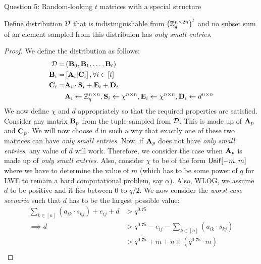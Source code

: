 \begin{solution}{Question 5: Random-looking $t$ matrices with a special structure}\label{ques:5}
    \begin{question}
        Define distribution $\mathcal{D}$ that is indistinguishable from $\left(\mathbb{Z}_q^{n\times 2n}\right)^t$ and no subset sum of an element sampled from this distribuion has \textit{only small entries}.
    \end{question}
    \tcblower{}
    \begin{proof}
        We define the distribution as follows:
        \begin{equation}
            \begin{split}
                \mathcal{D} = &\left(\mathbf{B}_0, \mathbf{B}_1, \ldots, \mathbf{B}_t\right)\\
                \mathbf{B}_i = &\left[\mathbf{A}_i | \mathbf{C}_i\right], \forall i\in [t]\\
                \mathbf{C}_i = &\mathbf{A}_i\cdot\mathbf{S}_i + \mathbf{E}_i + \mathbf{D}_i\\
                &\mathbf{A}_i\gets\mathbb{Z}_q^{n\times n}, \mathbf{S}_i\gets\chi^{n\times n}, \mathbf{E}_i\gets\chi^{n\times n}, \mathbf{D}_i\gets d^{n\times n}
            \end{split}
        \end{equation}
        We now define $\chi$ and $d$ appropriately so that the required properties are satisfied. Consider any matrix $\mathbf{B}_p$ from the tuple sampled from $\mathcal{D}$. This is made up of $\mathbf{A}_p$ and $\mathbf{C}_p$. We will now choose $d$ in such a way that exactly one of these two matrices can have \textit{only small entries}. Now, if $\mathbf{A}_p$ does not have \textit{only small entries}, any value of $d$ will work. Therefore, we consider the case when $\mathbf{A}_p$ is made up of \textit{only small entries}. Also, consider $\chi$ to be of the form $\mathsf{Unif}[-m, m]$ where we have to determine the value of $m$ (which has to be some power of $q$ for LWE to remain a hard computational problem, say $\alpha$). Also, WLOG, we assume $d$ to be positive and it lies between $0$ to $q/2$. We now consider the \textit{worst-case scenario} such that $d$ has to be the largest possible value:
        \begin{equation}
            \begin{split}
                \sum_{k\in[n]}\left(a_{ik}\cdot s_{kj}\right) + e_{ij} + d &> q^{0.75}\\
                \implies d &> q^{0.75} - e_{ij} - \sum_{k\in[n]}\left(a_{ik}\cdot s_{kj}\right)\\
                           &> q^{0.75} + m + n\times\left(q^{0.75}\cdot m\right)\\

\end{split}
\end{equation}
\end{proof}
\end{solution}
